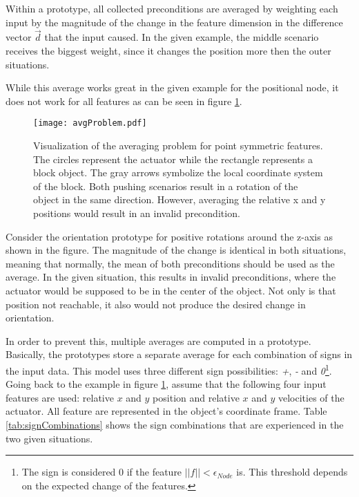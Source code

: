 Within a prototype, all collected preconditions are averaged by weighting each input by the magnitude of the change in the feature dimension in the difference vector $\vec{d}$ that the input caused.
In the given example, the middle scenario receives the biggest weight, since it changes the position more then the outer situations. 

While this average works great in the given example for the positional node, it does not work for all features as can be seen in figure \ref{fig:avgProblem}.

\begin{figure}
	\centering
	\texttt{[image: avgProblem.pdf]}
	\caption{Visualization of the averaging problem for point symmetric features. The circles represent the actuator while the rectangle represents a block object. The gray arrows symbolize the local coordinate system of the block. Both pushing scenarios result in a rotation of the object in the same direction. However, averaging the relative x and y positions would result in an invalid precondition.} 
	\label{fig:avgProblem}
\end{figure}

Consider the orientation prototype for positive rotations around the z-axis as shown in the figure. The magnitude of the change is identical in both situations, meaning that normally, the mean of both preconditions should be used as the average. In the given situation, this results in invalid preconditions, where the actuator would be supposed to be in the center of the object. Not only is that position not reachable, it also would not produce the desired change in orientation. 

In order to prevent this, multiple averages are computed in a prototype. Basically, the prototypes store a separate average for each combination of signs in the input data. This model uses three different sign possibilities: \textit{+}, \textit{-} and \textit{0}\footnote{The sign is considered 0 if the feature $||f|| < \epsilon_{Node}$ is. This threshold depends on the expected change of the features.}.
Going back to the example in figure \ref{fig:avgProblem}, assume that the following four input features are used: relative $x$ and $y$ position and relative $x$ and $y$ velocities of the actuator. All feature are represented in the object's coordinate frame. Table \ref{tab:signCombinations} shows the sign combinations that are experienced in the two given situations. 

